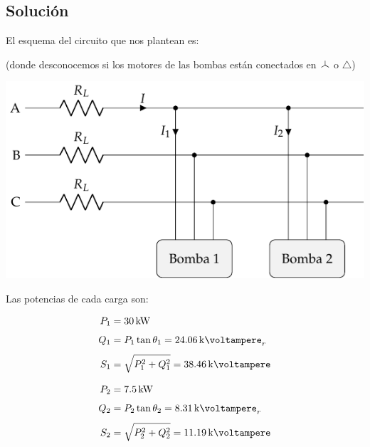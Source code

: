 \subsection*{Solución}

\begin{minipage}{0.32\linewidth}         
    
    \vspace{-5mm}

    El esquema del circuito que nos plantean es:

    \vspace{8mm}
    (donde desconocemos si los motores de las bombas están conectados en $\wye$ o $\triangle$)    
\end{minipage}
\hfill%
\begin{minipage}{0.6\linewidth}  

    \vspace{-3mm}
    \begin{center}
        \includegraphics[width=1\textwidth]{figuras/BT3_ej5_bombas.pdf}
    \end{center}   
\end{minipage}

\vspace{4mm}
 Las potencias de cada carga son:

\vspace{-2mm}
\begin{minipage}{0.5\linewidth}         
    \begin{align*}
        P_1 &= \SI{30}{\kilo\watt}\\[4pt]
        Q_1 &= P_1\tan \theta_1 = \SI{24.06}{\kilo\voltampere}_r\\[4pt]
        S_1 &= \sqrt{P_1^2 + Q_1^2} = \SI{38.46}{\kilo\voltampere}
    \end{align*}   
\end{minipage}
\hfill%
\begin{minipage}{0.5\linewidth}  
    \begin{align*}
        P_2 &= \SI{7.5}{\kilo\watt}\\[4pt]
        Q_2 &= P_2 \tan \theta_2 = \SI{8.31}{\kilo\voltampere}_r\\[4pt]
        S_2 &= \sqrt{P_2^2 + Q_2^2} = \SI{11.19}{\kilo\voltampere}
    \end{align*} 
\end{minipage}

